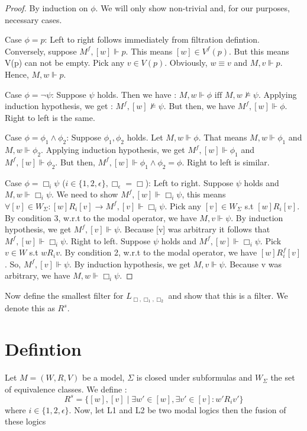 \documentclass[12pt, a4paper]{scrreprt}
\begin{document}
\begin{proof}
By induction on $\phi$. We will only show non-trivial and, for our purposes, necessary cases. \newline

Case $\phi = p$: Left to right follows immediately from filtration defintion. Conversely, suppose
$M^f, [w] \Vdash p$. This means $ [w] \in V^f(p)$. But this means V(p) can not be empty. Pick any $v\in V(p)$. Obviously, $w\equiv v$ and
$M,v\Vdash p$. Hence, $M,w \Vdash p$. \newline

Case $\phi = \neg \psi$: Suppose $\psi$ holds. Then we have : $M,w \Vdash \phi \mbox{ iff } M,w \nvDash \psi$. Applying 
induction hypothesis, we get : $M^f, [w] \nvDash \psi$. But then, we have $M^f, [w] \Vdash \phi$. Right to left is the same. \newline

Case $\phi = \phi_1 \land \phi_2$: Suppose $\phi_1, \phi_2$ holds. Let $M,w \Vdash \phi$. That means $M,w \Vdash \phi_1$ and $M,w \Vdash \phi_2$. Applying
induction hypothesis, we get $M^f,[w] \Vdash \phi_1$ and $M^f,[w] \Vdash \phi_2$. But then, $M^f,[w] \Vdash \phi_1 \land \phi_2 = \phi$. Right to left is similar. \newline

Case $\phi = \Box_i\psi$ ($i \in \{1,2,\epsilon\}, \Box_\epsilon = \Box$): Left to right. Suppose $\psi$ holds and  $M,w \Vdash \Box_i \psi$. 
We need to show $M^f,[w] \Vdash \Box_i \psi$, this means $\forall [v] \in W_\Sigma : [w]R_i[v] \rightarrow M^f,[v] \Vdash \Box_i \psi$. Pick any $[v] \in W_\Sigma$ s.t 
$[w]R_i[v]$. By condition 3, w.r.t to the modal operator, we have $M,v \Vdash \psi$. By induction hypothesis, we get $M^f,[v] \Vdash \psi$. Because [v] was arbitrary it follows that $M^f,[w] \Vdash \Box_i \psi$. \newline \newline
Right to left. Suppose $\psi$ holds and $M^f,[w] \Vdash \Box_i \psi$. Pick $v \in W$ s.t $wR_iv$. By condition 2, w.r.t to the modal operator, we have
$[w]R^f_i[v]$. So, $M^f, [v] \Vdash \psi$. By induction hypothesis, we get $M,v \Vdash \psi$. Because v was arbitrary, we have $M,w \Vdash \Box_i \psi$.

\end{proof} 

Now define the smallest filter for $L_{\Box,\Box_1,\Box_2}$ and show that this is a filter. We denote this as $R^s$.

\section{Defintion}
 Let $M = (W,R,V)$ be a model, $\Sigma$ is closed under subformulas and $W_\Sigma$ the set of equivalence classes. We define :
$$R^s = \{[w],[v] \mid \exists w' \in [w], \exists v' \in [v] : w'R_i v'\}$$
where $i \in \{1,2,\epsilon\}$.         Now, let L1 and L2 be two modal logics then the fusion of these logics 
\end{document}
